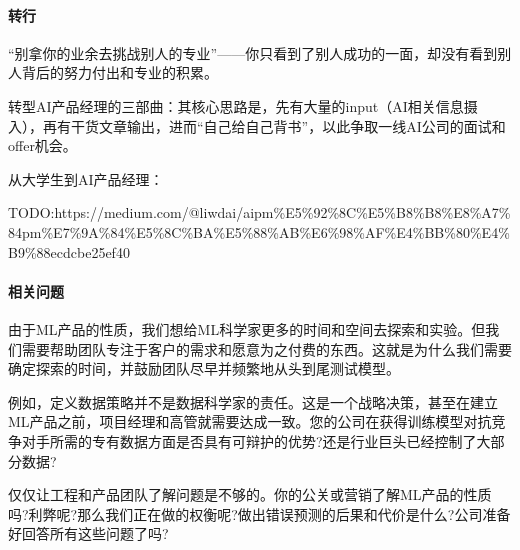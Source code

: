 \documentclass[letterpaper,10pt,english]{sphinxmanual}
\begin{document}
\paragraph{转行}
\label{\detokenize{chapter_introduction/AI_PM:id43}}
“别拿你的业余去挑战别人的专业”——你只看到了别人成功的一面，却没有看到别人背后的努力付出和专业的积累。%
\begin{footnote}[312]\sphinxAtStartFootnote
{}
%
\end{footnote}

转型AI产品经理的三部曲：其核心思路是，先有大量的input（AI相关信息摄入），再有干货文章输出，进而“自己给自己背书”，以此争取一线AI公司的面试和offer机会。

从大学生到AI产品经理：

TODO:https://medium.com/@liwdai/ai\sphinxhyphen{}pm\sphinxhyphen{}\%E5\%92\%8C\%E5\%B8\%B8\%E8\%A7\%84\sphinxhyphen{}pm\sphinxhyphen{}\%E7\%9A\%84\%E5\%8C\%BA\%E5\%88\%AB\%E6\%98\%AF\%E4\%BB\%80\%E4\%B9\%88\sphinxhyphen{}ecdcbe25ef40


\paragraph{相关问题}
\label{\detokenize{chapter_introduction/AI_PM:awesome-1}}\label{\detokenize{chapter_introduction/AI_PM:id44}}
由于ML产品的性质，我们想给ML科学家更多的时间和空间去探索和实验。但我们需要帮助团队专注于客户的需求和愿意为之付费的东西。这就是为什么我们需要确定探索的时间，并鼓励团队尽早并频繁地从头到尾测试模型。

例如，定义数据策略并不是数据科学家的责任。这是一个战略决策，甚至在建立ML产品之前，项目经理和高管就需要达成一致。您的公司在获得训练模型对抗竞争对手所需的专有数据方面是否具有可辩护的优势?还是行业巨头已经控制了大部分数据?

仅仅让工程和产品团队了解问题是不够的。你的公关或营销了解ML产品的性质吗?利弊呢?那么我们正在做的权衡呢?做出错误预测的后果和代价是什么?公司准备好回答所有这些问题了吗?
%
\begin{footnote}[313]\sphinxAtStartFootnote
{}
%
\end{footnote}
\end{document}
